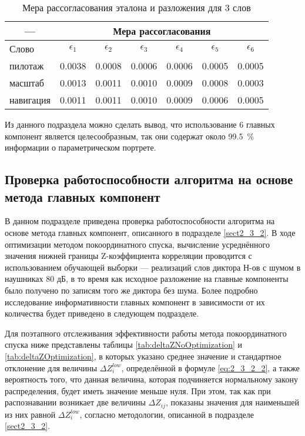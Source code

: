 \begin{table}[h]
	\centering
	\caption{Мера рассогласования эталона и разложения для 3 слов}
	\label{tab:mismatchMeasure}
	\begin{tabular}{|l | c | c | c | c | c | c |}
		\hline
		\multicolumn{1}{|c|}{---} & \multicolumn{6}{c|}{Мера рассогласования} \\
		\hline
		Слово \phantom{0000000} & \phantom{000}$\epsilon_1$\phantom{000} & \phantom{000}$\epsilon_2$\phantom{000} & \phantom{000}$\epsilon_3$\phantom{000} & \phantom{000}$\epsilon_4$\phantom{000} & \phantom{000}$\epsilon_5$\phantom{000} & \phantom{000}$\epsilon_6$\phantom{000} \\
		\hline
		пилотаж		& 0.0038	& 0.0008	& 0.0006	& 0.0006	& 0.0005	& 0.0005	\\
		масштаб		& 0.0013	& 0.0011	& 0.0010	& 0.0009	& 0.0008	& 0.0003	\\
		навигация	& 0.0011	& 0.0011	& 0.0010	& 0.0009	& 0.0006	& 0.0005	\\
		\hline
	\end{tabular}
\end{table}

Из данного подраздела можно сделать вывод, что использование 6 главных компонент является целесообразным, так они содержат около 99.5~\% информации о параметрическом портрете.


\subsection{Проверка работоспособности алгоритма на основе метода главных компонент} \label{sect3_3_2}

В данном подразделе приведена проверка работоспособности алгоритма на основе метода главных компонент, описанного в подразделе \ref{sect2_3_2}.
В ходе оптимизации методом покоординатного спуска, вычисление усреднённого значения нижней границы Z-коэффициента корреляции проводится с использованием обучающей выборки --- реализаций слов диктора Н-ов с шумом в наушниках 80 дБ, в то время как исходное разложение на главные компоненты было получено по записям того же диктора без шума.
Более подробно исследование информативности главных компонент в зависимости от их количества будет приведено в следующем подразделе.

Для поэтапного отслеживания эффективности работы метода покоординатного спуска ниже представлены таблицы \ref{tab:deltaZNoOptimization} и \ref{tab:deltaZOptimization}, в которых указано среднее значение и стандартное отклонение для величины $\Delta Z^{low}_{i}$, определённой в формуле \eqref{eq:2_3_2_2}, а также вероятность того, что данная величина, которая подчиняется нормальному закону распределения, будет иметь значение меньше нуля.
При этом, так как при распознавании возникает две величины $\Delta Z_{ij}$, показаны значения для наименьшей из них равной $\Delta Z^{low}_{i}$, согласно методологии, описанной в подразделе \ref{sect2_3_2}.


